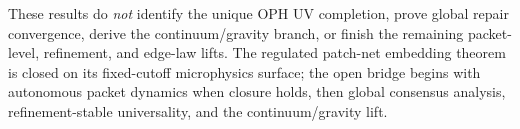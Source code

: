 \documentclass[11pt]{article}
\begin{document}
These results do \emph{not} identify the unique OPH UV completion, prove global repair
convergence, derive the continuum/gravity branch, or finish the remaining packet-level,
refinement, and edge-law lifts. The regulated patch-net embedding theorem is closed on its
fixed-cutoff microphysics surface; the open bridge begins with autonomous packet dynamics
when closure holds, then global consensus analysis, refinement-stable universality, and the
continuum/gravity lift.

\appendix

\end{document}
